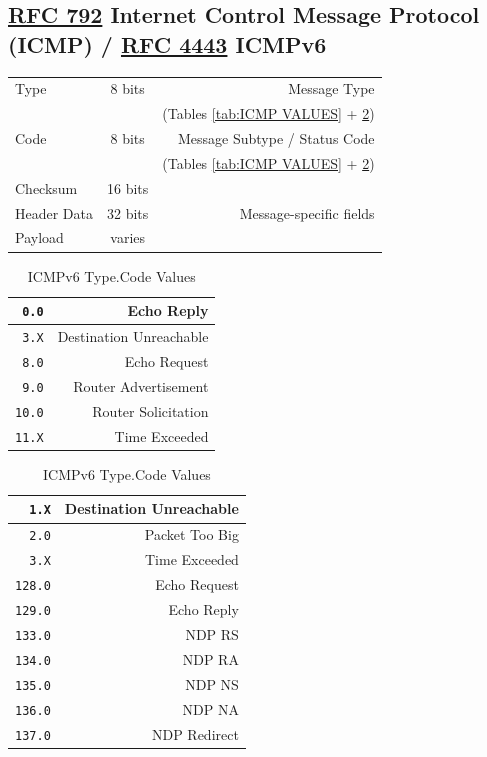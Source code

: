 \documentclass[12pt]{article}
\newcommand{\RFC}[1]{\href{https://datatracker.ietf.org/doc/html/rfc#1}{RFC #1}}
\begin{document}
	\subsection{\RFC{792} Internet Control Message Protocol (ICMP) / \RFC{4443} ICMPv6 \label{subsec:ICMP}}
	\begin{table}[H]
	\centering
	\begin{tabular}{| l | c | r |}
	\hline
	Type			& 8 bits	& Message Type\\
				&		& (Tables \ref{tab:ICMP VALUES} + \ref{tab:ICMPV6 VALUES}) \\\hline
	Code			& 8 bits	& Message Subtype / Status Code\\
				&		& (Tables \ref{tab:ICMP VALUES} + \ref{tab:ICMPV6 VALUES})\\\hline
	Checksum		& 16 bits	&\\\hline
	Header Data	& 32 bits	& Message-specific fields\\\hline
	Payload		& varies	&\\\hline
	\end{tabular}\end{table}

	\begin{table}[H]
	\begin{minipage}{.45\linewidth}
	\centering
	\caption{ICMP Type.Code Values \label{tab:ICMP VALUES}}
	\begin{tabular}{| r | r |}
	\hline
	\texttt{0.0}	& Echo Reply\\\hline
	\texttt{3.X} 	& Destination Unreachable\\\hline
	\texttt{8.0}	& Echo Request\\\hline
	\texttt{9.0}	& Router Advertisement\\
	\texttt{10.0}	& Router Solicitation\\\hline
	\texttt{11.X} & Time Exceeded\\\hline
	\end{tabular}\end{minipage}\hfill
	\begin{minipage}{.45\linewidth}
	\centering
	\caption{ICMPv6 Type.Code Values\label{tab:ICMPV6 VALUES}}
	\begin{tabular}{| r | r |}
	\hline
	\texttt{1.X}	 	& Destination Unreachable\\\hline
	\texttt{2.0}		& Packet Too Big\\\hline
	\texttt{3.X}	 	& Time Exceeded\\\hline
	\texttt{128.0}	& Echo Request\\
	\texttt{129.0}	& Echo Reply\\\hline
	\texttt{133.0}	& NDP RS\\
	\texttt{134.0}	& NDP RA\\
	\texttt{135.0}	& NDP NS\\
	\texttt{136.0}	& NDP NA\\
	\texttt{137.0}	& NDP Redirect\\\hline
	\end{tabular}\end{minipage}\end{table}
\end{document}
